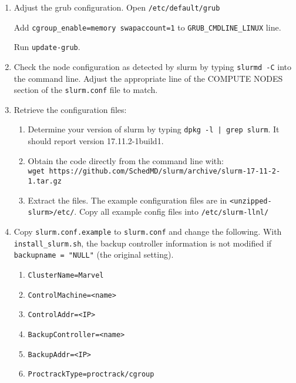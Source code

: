 \begin{enumerate}
\begin{enumerate}
	\item Adjust the grub configuration. Open \texttt{/etc/default/grub} 
	
	Add \texttt{cgroup\_enable=memory swapaccount=1} to  \texttt{GRUB\_CMDLINE\_LINUX} line.
	
	Run \texttt{update-grub}.

	\item Check the node configuration as detected by slurm by typing \texttt{slurmd -C} into the command line. Adjust the appropriate line of the COMPUTE NODES section of the \texttt{slurm.conf} file to match.

	\item Retrieve the configuration files:

		\begin{enumerate}
		\item Determine your version of slurm by typing \texttt{dpkg -l | grep slurm}. It should report version 17.11.2-1build1. 
	
		\item Obtain the code directly from the command line with: \\ 
	\texttt{wget https://github.com/SchedMD/slurm/archive/slurm-17-11-2-1.tar.gz}
	 
		\item Extract the files. The example configuration files are in \texttt{<unzipped-slurm>/etc/}. Copy all example config files into \texttt{/etc/slurm-llnl/}
	\end{enumerate}

	\item Copy \texttt{slurm.conf.example} to \texttt{slurm.conf} and change the following. With \texttt{install\_slurm.sh}, the backup controller information is not modified if \texttt{backupname = "NULL"} (the original setting).

		\begin{enumerate}
		\item \texttt{ClusterName=Marvel}

		\item \texttt{ControlMachine=<name>}

		\item \texttt{ControlAddr=<IP>}

		\item \texttt{BackupController=<name>}

		\item \texttt{BackupAddr=<IP>}

		\item \texttt{ProctrackType=proctrack/cgroup}	


\end{enumerate}
\end{enumerate}
\end{enumerate}
